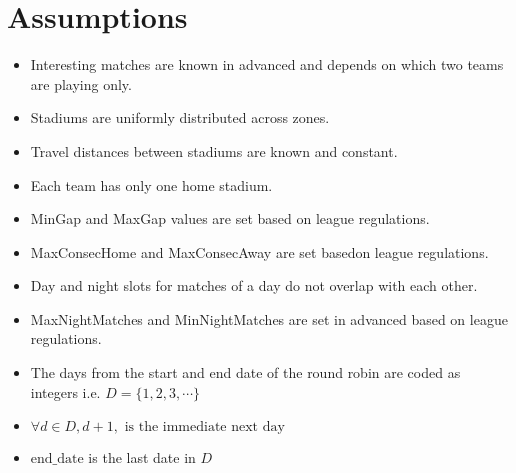 \documentclass[a4paper, 12pt]{article}
\begin{document}
\section*{Assumptions}
\begin{itemize}
    \item Interesting matches are known in advanced and depends on which two teams are playing only.
    \item Stadiums are uniformly distributed across zones.
    \item Travel distances between stadiums are known and constant.
    \item Each team has only one home stadium.
    \item MinGap and MaxGap values are set based on league regulations.
    \item MaxConsecHome and MaxConsecAway are set basedon league regulations.
    \item Day and night slots for matches of a day do not overlap with each other.
    \item MaxNightMatches and MinNightMatches are set in advanced based on league regulations.
    \item The days from the start and end date of the round robin are coded as integers i.e. $D = \{1,2,3, \cdots \}$
    \item $\forall d \in D, d+1, \text{ is the immediate next day}$ 
    \item $\text{end\_date}$ is the last date in $D$
\end{itemize}
\end{document}
